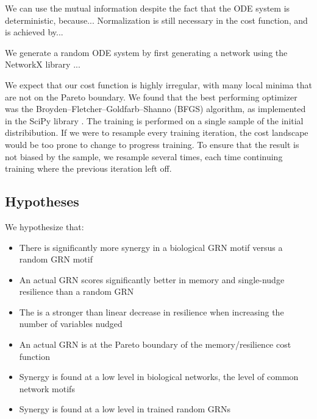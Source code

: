 \documentclass[../main.tex]{subfiles}
\begin{document}
We can use the mutual information despite the fact that the ODE system is deterministic, because...
Normalization is still necessary in the cost function, and is achieved by...

We generate a random ODE system by first generating a network using the NetworkX library \cite{networkx}...

We expect that our cost function is highly irregular, with many local minima that are not on the Pareto boundary.
We found that the best performing optimizer was the Broyden–Fletcher–Goldfarb–Shanno (BFGS) algorithm, as implemented in the SciPy library \cite{fletcher2013practical, scipy}.
The training is performed on a single sample of the initial distribibution.
If we were to resample every training iteration, the cost landscape would be too prone to change to progress training.
To ensure that the result is not biased by the sample, we resample several times, each time continuing training where the previous iteration left off.

\subsection{Hypotheses}

We hypothesize that:

\begin{itemize}
\item There is significantly more synergy in a biological GRN motif versus a random GRN motif
\item An actual GRN scores significantly better in memory and single-nudge resilience than a random GRN
\item The is a stronger than linear decrease in resilience when increasing the number of variables nudged
\item An actual GRN is at the Pareto boundary of the memory/resilience cost function
\item Synergy is found at a low level in biological networks, the level of common network motifs 
\item Synergy is found at a low level in trained random GRNs
\end{itemize}
\end{document}
